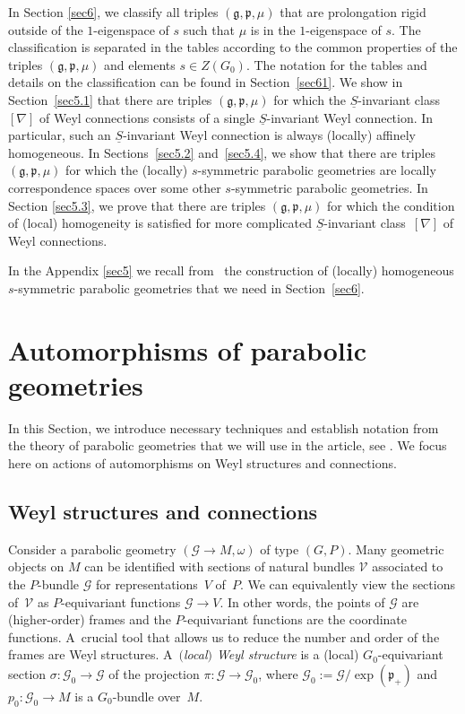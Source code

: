 \documentclass[pdftex]{sigma}
\newcommand{\om}{\omega}
\newcommand{\si}{\sigma}
\newcommand{\un}{\underline}
\newcommand{\ba}{\mathcal{G}}
\newcommand{\fg}{\mathfrak g}
\newcommand{\fp}{\mathfrak p}
\numberwithin{equation}{section}
\begin{document}
In Section \ref{sec6}, we classify all triples $(\fg,\fp,\mu)$ that are prolongation rigid outside of the $1$-eigenspace of $s$ such that $\mu$ is in the $1$-eigenspace of $s$. The classif\/ication is separated in the tables according to the common properties of the triples $(\fg,\fp,\mu)$ and elements $s\in Z(G_0)$. The notation for the tables and details on the classif\/ication can be found in Section~\ref{sec61}. We show in Section~\ref{sec5.1} that there are triples $(\fg,\fp,\mu)$ for which the $\un S$-invariant class $[\nabla]$ of Weyl connections consists of a single $\un S$-invariant Weyl connection. In particular, such an $\un S$-invariant Weyl connection is always (locally) af\/f\/inely homogeneous. In Sections~\ref{sec5.2} and~\ref{sec5.4}, we show that there are triples $(\fg,\fp,\mu)$ for which the (locally) $s$-symmetric parabolic geometries are locally correspondence spaces over some other $s$-symmetric parabolic geometries. In Section \ref{sec5.3}, we prove that there are triples $(\fg,\fp,\mu)$ for which the condition of (local) homogeneity is satisf\/ied for more complicated $\un S$-invariant class~$[\nabla]$ of Weyl connections.

In the Appendix \ref{sec5} we recall from~\cite{GZ2} the construction of (locally) homogeneous $s$-symmetric parabolic geometries that we need in Section~\ref{sec6}.

\section{Automorphisms of parabolic geometries} \label{sec2}
In this Section, we introduce necessary techniques and establish notation from the theory of parabolic geometries that we will use in the article, see \cite[Section 5.1]{parabook}. We focus here on actions of automorphisms on Weyl structures and connections.

\subsection{Weyl structures and connections}\label{sec2.1}

Consider a parabolic geometry $(\ba \to M, \om)$ of type $(G,P)$. Many geometric objects on $M$ can be identif\/ied with sections of natural bundles $\mathcal{V}$ associated to the $P$-bundle $\ba$ for representa\-tions~$V$ of~$P$. We can equivalently view the sections of~$\mathcal{V}$ as $P$-equivariant functions $\ba \to V$. In other words, the points of $\ba$ are (higher-order) frames and the $P$-equivariant functions are the coordinate functions. A~crucial tool that allows us to reduce the number and order of the frames are Weyl structures. A~\emph{$($local$)$ Weyl structure} is a (local) $G_0$-equivariant section $\si\colon \ba_0 \to \ba$ of the projection $\pi\colon \ba \to \ba_0$, where $\ba_0:=\ba /\exp(\fp_+)$ and $p_0\colon \ba_0\to M$ is a $G_0$-bundle over~$M$.
\end{document}
